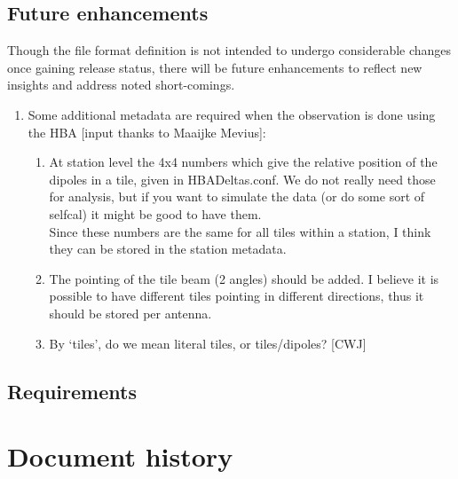 \documentclass[a4paper,10pt,bibtotoc]{scrartcl}
\begin{document}
\subsection{Future enhancements}

Though the file format definition is not intended to undergo
considerable changes once gaining release status, there will be future
enhancements to reflect new insights and address noted short-comings.

\begin{enumerate}
\item Some additional metadata are required when the observation is
  done using the HBA [input thanks to Maaijke Mevius]:
  \begin{enumerate}
  \item At station level the 4x4 numbers which give the relative
    position of the dipoles in a tile, given in HBADeltas.conf. We do
    not really need those for analysis, but if you want to simulate
    the data (or do some sort of selfcal) it might be good to have
    them. \\
    Since these numbers are the same for all tiles within a station, I
    think they can be stored in the station metadata.
  \item The pointing of the tile beam (2 angles) should be added. I
    believe it is possible to have different tiles pointing in
    different directions, thus it should be stored per antenna.
  \item By `tiles', do we mean literal tiles, or tiles/dipoles? [CWJ]
  \end{enumerate}
\end{enumerate}


\clearpage






\subsection{Requirements}
\label{sec:requirements}


\section{Document history}
\end{document}

